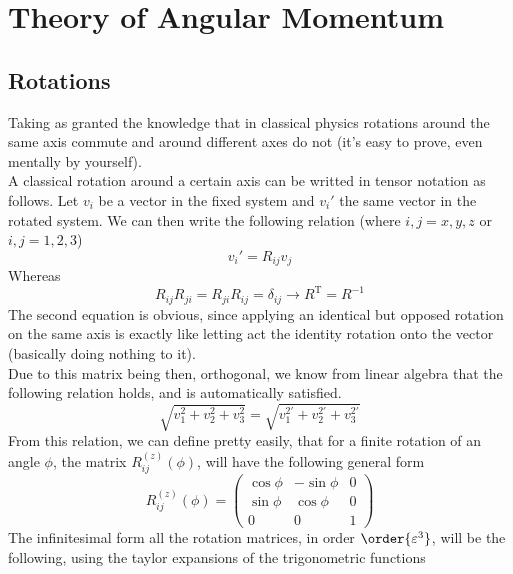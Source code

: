 \documentclass[a4paper, 11pt]{book}
\newcommand{\1}{\opr{\mathds{1}}}
\newcommand{\tposed}[1]{#1^{\text{T}}}
\newcommand{\kd}[1]{\delta_{#1}}
\theoremstyle{plain}
\begin{document}
	\chapter{Theory of Angular Momentum}
	\section{Rotations}
	Taking as granted the knowledge that in classical physics rotations around the same axis commute and around different axes do not (it's easy to prove, even mentally by yourself).\\
	A classical rotation around a certain axis can be writted in tensor notation as follows. Let $v_i$ be a vector in the fixed system and $v_i'$ the same vector in the rotated system. We can then write the following relation (where $i,j=x,y,z$ or $i,j=1,2,3$)
	\begin{equation*}
		v_i'=R_{ij}v_j
	\end{equation*}
	Whereas
	\begin{equation*}
		R_{ij}R_{ji}=R_{ji}R_{ij}=\kd{ij}\longrightarrow\tposed{R}=R^{-1}
	\end{equation*}
	The second equation is obvious, since applying an identical but opposed rotation on the same axis is exactly like letting act the identity rotation onto the vector (basically doing nothing to it).\\
	Due to this matrix being then, orthogonal, we know from linear algebra that the following relation holds, and is automatically satisfied.
	\begin{equation*}
		\sqrt{v_1^2+v_2^2+v_3^2}=\sqrt{v_1^{2'}+v_2^{2'}+v_3^{2'}}
	\end{equation*}
	From this relation, we can define pretty easily, that for a finite rotation of an angle $\phi$, the matrix $R_{ij}^{(z)}(\phi)$, will have the following general form
	\begin{equation}
		R_{ij}^{(z)}(\phi)=\begin{pmatrix}
			\cos\phi&-\sin\phi&0\\
			\sin\phi&\cos\phi&0\\
			0&0&1
		\end{pmatrix}
		\label{eq:finiterotmatrix}
	\end{equation}
	The infinitesimal form all the rotation matrices, in order $\order{\varepsilon^3}$, will be the following, using the taylor expansions of the trigonometric functions
\end{document}
